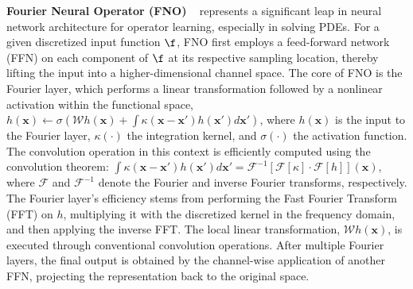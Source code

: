 \noindent\textbf{Fourier Neural Operator (FNO)}
~\citep{li2020fourier} represents a significant leap in neural network architecture for operator learning, especially in solving PDEs. For a given discretized input function \(\f\), FNO first employs a feed-forward network (FFN) on each component of \(\f\) at its respective sampling location, thereby lifting the input into a higher-dimensional channel space. The core of FNO is the Fourier layer, which performs a linear transformation followed by a nonlinear activation within the functional space,  
$ h(\mathbf{x}) \leftarrow \sigma \left( \mathcal{W}h(\mathbf{x}) + \int \kappa(\mathbf{x} - \mathbf{x}')h(\mathbf{x}')d\mathbf{x}' \right)$, where \(h(\mathbf{x})\) is the input to the Fourier layer, \(\kappa(\cdot)\) the integration kernel, and \(\sigma(\cdot)\) the activation function. The convolution operation in this context is efficiently computed using the convolution theorem:
$ \int \kappa(\mathbf{x} - \mathbf{x}')h(\mathbf{x}')d\mathbf{x}' = \mathcal{F}^{-1} [\mathcal{F}[\kappa] \cdot \mathcal{F}[h]](\mathbf{x})$, 
where \(\mathcal{F}\) and \(\mathcal{F}^{-1}\) denote the Fourier and inverse Fourier transforms, respectively. The Fourier layer's efficiency stems from performing the Fast Fourier Transform (FFT) on \(h\), multiplying it with the discretized kernel in the frequency domain, and then applying the inverse FFT. The local linear transformation, \(\mathcal{W}h(\mathbf{x})\), is executed through conventional convolution operations. After multiple Fourier layers, the final output is obtained by the channel-wise application of another FFN, projecting the representation back to the original space.


